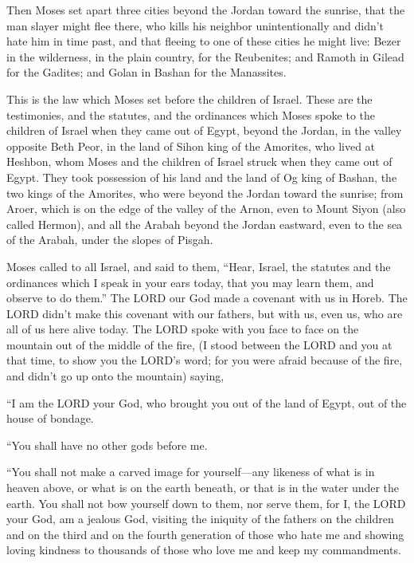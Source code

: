 \myverse{}Then Moses set apart three cities beyond the Jordan toward the
sunrise,
\myverse{}that the man slayer might flee there, who kills his neighbor unintentionally
and didn’t hate him in time past, and that fleeing to one of these cities he might live:
\myverse{}Bezer in the wilderness, in the plain country, for the Reubenites; and Ramoth
in Gilead for the Gadites; and Golan in Bashan for the Manassites.


\myverse{}This is the law which Moses set before the children of Israel.
\myverse{}These are the testimonies, and the statutes, and the ordinances which Moses
spoke to the children of Israel when they came out of Egypt,
\myverse{}beyond the Jordan, in the valley opposite Beth Peor, in the land of Sihon
king of the Amorites, who lived at Heshbon, whom Moses and the children of Israel struck when they came
out of Egypt.
\myverse{}They took possession of his land and the land of Og king of Bashan, the two
kings of the Amorites, who were beyond the Jordan toward the sunrise;
\myverse{}from Aroer, which is on the edge of the valley of the Arnon, even to Mount
Siyon (also called Hermon),
\myverse{}and all the Arabah beyond the Jordan eastward, even to the sea of the Arabah,
under the slopes of Pisgah.


\mychapter{} \myverse*{}Moses called to all Israel, and said to them, “Hear, Israel, the
statutes and the ordinances which I speak in your ears today, that you may learn them, and observe to
do them.”
\myverse{}The LORD our God made a covenant with us in Horeb.
\myverse{}The LORD didn’t make this covenant with our fathers, but with us, even us, who are all of us here alive today.
\myverse{}The LORD spoke with you face to face on the mountain out of the middle of the fire,
\myverse{}(I stood between the LORD and you at that time, to show you the LORD’s word;
for you were afraid because of the fire, and didn’t go up onto the mountain) saying,


\myverse{}“I am the LORD your God, who brought you out of the land
	of Egypt, out of the house of bondage.
	
	
	\myverse{}“You shall have no other gods before me.
	
	
	\myverse{}“You shall not make a carved image for yourself—any likeness of
	what is in heaven above, or what is on the earth beneath, or that is in the water under the earth.
	\myverse{}You shall not bow yourself down to them, nor serve them, for I, the LORD your
	God, am a jealous God, visiting the iniquity of the fathers on the children and on the third and on the
	fourth generation of those who hate me
	\myverse{}and showing loving kindness to thousands of those who love me and keep my
	commandments.
	
